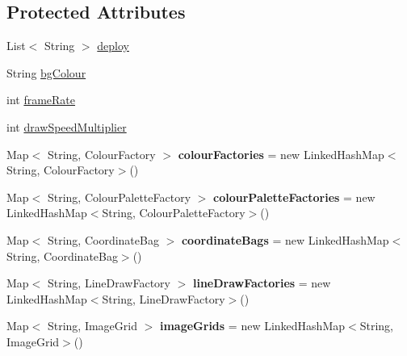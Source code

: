 \subsection*{Protected Attributes}
\begin{DoxyCompactItemize}
\item 
List$<$ String $>$ \hyperlink{group__scene_ga4dd990306b73a11f8919577de81612c0}{deploy}
\item 
String \hyperlink{group__scene_gaba03aa65939f5ac2c4bfac931088a26e}{bgColour}
\item 
int \hyperlink{group__scene_ga8d80f585cc4c2089e31b55e12085fcbd}{frameRate}
\item 
int \hyperlink{group__scene_ga1842bb351dbdbb9eab2700adb61ac322}{drawSpeedMultiplier}
\item 
\hypertarget{classdev_1_1boxy_1_1fortyfive_1_1core_1_1scene_1_1_scene_factory_a65caf4120ce855a3b573c6fb03835f02}{
Map$<$ String, ColourFactory $>$ {\bfseries colourFactories} = new LinkedHashMap$<$String, ColourFactory$>$()}
\label{d4/d69/classdev_1_1boxy_1_1fortyfive_1_1core_1_1scene_1_1_scene_factory_a65caf4120ce855a3b573c6fb03835f02}

\item 
\hypertarget{classdev_1_1boxy_1_1fortyfive_1_1core_1_1scene_1_1_scene_factory_aa1e2b6fa420fd1b514f70bf6149fb3a2}{
Map$<$ String, ColourPaletteFactory $>$ {\bfseries colourPaletteFactories} = new LinkedHashMap$<$String, ColourPaletteFactory$>$()}
\label{d4/d69/classdev_1_1boxy_1_1fortyfive_1_1core_1_1scene_1_1_scene_factory_aa1e2b6fa420fd1b514f70bf6149fb3a2}

\item 
\hypertarget{classdev_1_1boxy_1_1fortyfive_1_1core_1_1scene_1_1_scene_factory_af421f403eadfeedfdb0d16e0a2efc1c4}{
Map$<$ String, CoordinateBag $>$ {\bfseries coordinateBags} = new LinkedHashMap$<$String, CoordinateBag$>$()}
\label{d4/d69/classdev_1_1boxy_1_1fortyfive_1_1core_1_1scene_1_1_scene_factory_af421f403eadfeedfdb0d16e0a2efc1c4}

\item 
\hypertarget{classdev_1_1boxy_1_1fortyfive_1_1core_1_1scene_1_1_scene_factory_a3598916f610b33aefb21b5c1f5a1eefe}{
Map$<$ String, LineDrawFactory $>$ {\bfseries lineDrawFactories} = new LinkedHashMap$<$String, LineDrawFactory$>$()}
\label{d4/d69/classdev_1_1boxy_1_1fortyfive_1_1core_1_1scene_1_1_scene_factory_a3598916f610b33aefb21b5c1f5a1eefe}

\item 
\hypertarget{classdev_1_1boxy_1_1fortyfive_1_1core_1_1scene_1_1_scene_factory_a8fb383d1b6b4b095238881fbd536891b}{
Map$<$ String, ImageGrid $>$ {\bfseries imageGrids} = new LinkedHashMap$<$String, ImageGrid$>$()}
\label{d4/d69/classdev_1_1boxy_1_1fortyfive_1_1core_1_1scene_1_1_scene_factory_a8fb383d1b6b4b095238881fbd536891b}


\end{DoxyCompactItemize}

